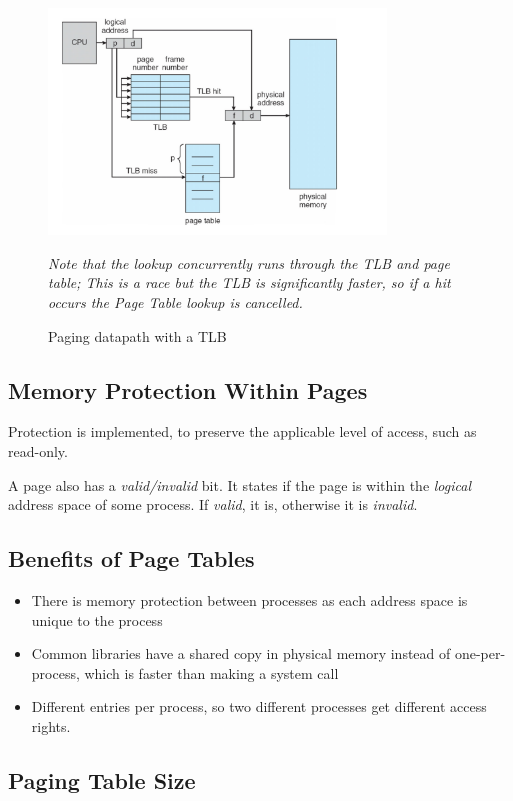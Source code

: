 \documentclass[a4]{article}
\begin{document}
\begin{figure}[H]
  \centering
  \includegraphics[width=0.8\textwidth]{tlbPaging}
  \caption{Paging datapath with a TLB}
  \textit{\footnotesize Note that the lookup concurrently runs through the TLB and page table; This is a race but the TLB is significantly faster, so if a hit occurs the Page Table lookup is cancelled.}
\end{figure}

\subsection{Memory Protection Within Pages}

Protection is implemented, to preserve the applicable level of access, such as read-only.

A page also has a \textit{valid/invalid} bit. It states if the page is within the \textit{logical} address space of some process. If \textit{valid}, it is, otherwise it is \textit{invalid}.

\subsection{Benefits of Page Tables}

\begin{itemize}
\item 
  There is memory protection between processes as each address space is unique to the process
\item 
  Common libraries have a shared copy in physical memory instead of one-per-process, which is faster than making a system call
\item 
Different entries per process, so two different processes get different access rights.
\end{itemize}

\subsection{Paging Table Size}
\end{document}
